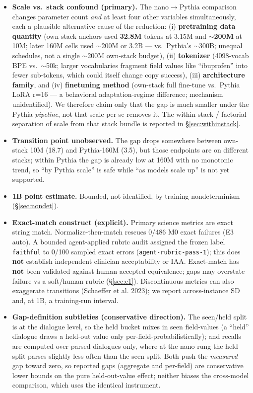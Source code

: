 \documentclass[11pt]{article}
\begin{document}
\begin{itemize}
\item
  \textbf{Scale vs.~stack confound (primary).} The nano$\rightarrow$Pythia comparison changes parameter count \emph{and} at least four other variables simultaneously, each a plausible alternative cause of the reduction: (i) \textbf{pretraining data quantity} (own-stack anchors used \textbf{32.8M} tokens at 3.15M and $\sim$\textbf{200M} at 10M; later 160M cells used $\sim$200M or 3.2B --- vs.\ Pythia's $\sim$300B; unequal schedules, not a single $\sim$200M own-stack budget), (ii) \textbf{tokenizer} (4098-vocab BPE vs.~$\sim$50k; larger vocabularies fragment field values like ``ibuprofen'' into fewer sub-tokens, which could itself change copy success), (iii) \textbf{architecture family}, and (iv) \textbf{finetuning method} (own-stack full fine-tune vs.~Pythia LoRA r=16 --- a behavioral adaptation-regime difference; mechanism unidentified). We therefore claim only that the gap is much smaller under the Pythia \emph{pipeline}, not that scale per se removes it. The within-stack / factorial separation of scale from that stack bundle is reported in \S\ref{sec:withinstack}.
\item
  \textbf{Transition point unobserved.} The gap drops somewhere between own-stack 10M (18.7) and Pythia-160M (3.5), but those endpoints are on different stacks; within Pythia the gap is already low at 160M with no monotonic trend, so ``by Pythia scale'' is safe while ``as models scale up'' is not yet supported.
\item
  \textbf{1B point estimate.} Bounded, not identified, by training nondeterminism (\S\ref{sec:nondet}).
\item
  \textbf{Exact-match construct (explicit).} Primary science metrics are exact string match. Normalize-then-match rescues 0/486 M0 exact failures (E3 auto). A bounded agent-applied rubric audit assigned the frozen label \texttt{faithful} to 0/100 sampled exact errors (\texttt{agent-rubric-pass-1}); this does \textbf{not} establish independent clinician acceptability or IAA. Exact-match has \textbf{not} been validated against human-accepted equivalence; gaps may overstate failure vs a soft/human rubric (\S\ref{sec:e1}). Discontinuous metrics can also exaggerate transitions (Schaeffer et al. 2023); we report across-instance SD and, at 1B, a training-run interval.
\item
  \textbf{Gap-definition subtleties (conservative direction).} The seen/held split is at the dialogue level, so the held bucket mixes in seen field-values (a ``held'' dialogue draws a held-out value only per-field-probabilistically); and recalls are computed over parsed dialogues only, where at the nano rung the held split parses slightly less often than the seen split. Both push the \emph{measured} gap toward zero, so reported gaps (aggregate and per-field) are conservative lower bounds on the pure held-out-value effect; neither biases the cross-model comparison, which uses the identical instrument.

\end{itemize}
\end{document}
